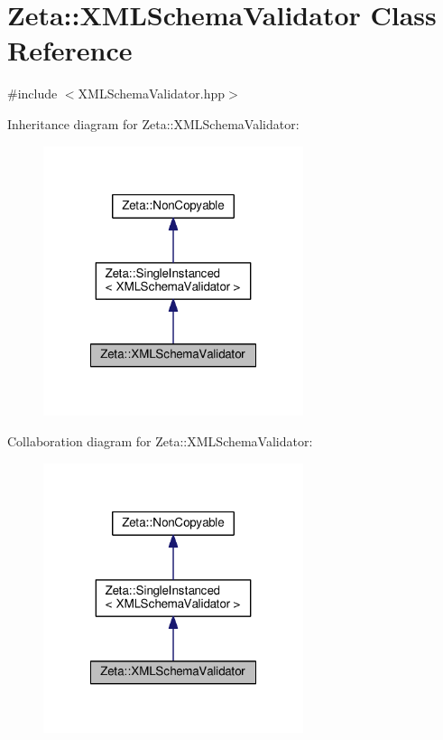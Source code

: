 \hypertarget{classZeta_1_1XMLSchemaValidator}{\section{Zeta\+:\+:X\+M\+L\+Schema\+Validator Class Reference}
\label{classZeta_1_1XMLSchemaValidator}
}


{\ttfamily \#include $<$X\+M\+L\+Schema\+Validator.\+hpp$>$}



Inheritance diagram for Zeta\+:\+:X\+M\+L\+Schema\+Validator\+:\nopagebreak
\begin{figure}[H]
\begin{center}
\leavevmode
\includegraphics[width=216pt]{classZeta_1_1XMLSchemaValidator__inherit__graph}
\end{center}
\end{figure}


Collaboration diagram for Zeta\+:\+:X\+M\+L\+Schema\+Validator\+:\nopagebreak
\begin{figure}[H]
\begin{center}
\leavevmode
\includegraphics[width=216pt]{classZeta_1_1XMLSchemaValidator__coll__graph}
\end{center}
\end{figure}
